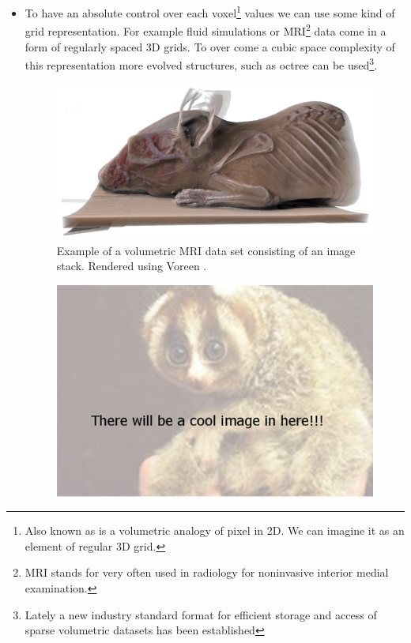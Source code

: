 \begin{itemize}
\item {}
To have an absolute control over each voxel\footnote{Also known as  is a volumetric analogy of pixel in 2D. We can imagine it as an element of regular 3D grid.} values we can use some kind of grid representation. For example fluid simulations or MRI\footnote{MRI stands for  very often used in radiology for noninvasive interior medial examination. } data come in a form of regularly spaced 3D grids. To over come a cubic space complexity of this representation more evolved structures, such as octree can be used\footnote{Lately a new industry standard format \cite{OPENVDB} for efficient storage and access of sparse volumetric datasets has been established}.

\begin{minipage}{\linewidth}
      \begin{minipage}{0.45\linewidth}
          \begin{figure}[H]
              \includegraphics[width=\linewidth]{images/volumerat}
              \captionsetup{width=\linewidth}
              \caption[Volumetric image data example, source \cite{RDR10}.]{Example of a volumetric MRI data set consisting of an image stack. Rendered using Voreen  \cite{RDR10}.}\label{fig:RAT}
          \end{figure}
      \end{minipage}
      \hspace{0.05\linewidth}
      \begin{minipage}{0.45\linewidth}
          \begin{figure}[H]
              \includegraphics[width=\linewidth]{images/temp}

\end{figure}
\end{minipage}
\end{minipage}
\end{itemize}
